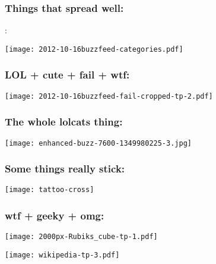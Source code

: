 \begin{frame}

  \frametitle{Things that spread well:}

  :

  \begin{center}
    \texttt{[image: 2012-10-16buzzfeed-categories.pdf]}
  \end{center}


\end{frame}

\begin{frame}
  \frametitle{LOL + cute + fail + wtf:}

  
  \begin{center}
    \texttt{[image: 2012-10-16buzzfeed-fail-cropped-tp-2.pdf]}

  \end{center}

\end{frame}


\begin{frame}
  \frametitle{The whole lolcats thing:}

  \texttt{[image: enhanced-buzz-7600-1349980225-3.jpg]}
\end{frame}

\begin{frame}
  \frametitle{Some things really stick:}

  \begin{center}
    \texttt{[image: tattoo-cross]}
  \end{center}

\end{frame}


\begin{frame}
  \frametitle{wtf + geeky + omg:}

  \begin{center}
    \texttt{[image: 2000px-Rubiks\_cube-tp-1.pdf]}
  \end{center}
  
\texttt{[image: wikipedia-tp-3.pdf]}

\end{frame}


